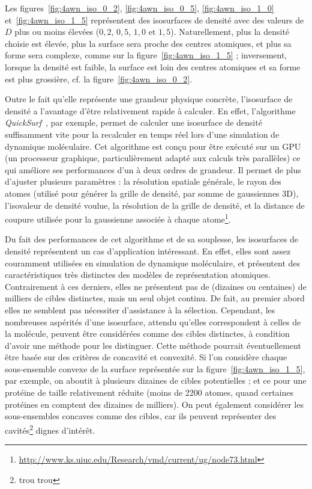 	Les figures~\ref{fig:4awn_iso_0_2}, \ref{fig:4awn_iso_0_5}, \ref{fig:4awn_iso_1_0} et~\ref{fig:4awn_iso_1_5} représentent des isosurfaces de densité avec des valeurs de $D$ plus ou moins élevées ($0,2$, $0,5$, $1,0$ et $1,5$). Naturellement, plus la densité choisie est élevée, plus la surface sera proche des centres atomiques, et plus sa forme sera complexe, comme sur la figure~\ref{fig:4awn_iso_1_5} ; inversement, lorsque la densité est faible, la surface est loin des centres atomiques et sa forme est plus grossière, cf. la figure~\ref{fig:4awn_iso_0_2}.
	
	Outre le fait qu'elle représente une grandeur physique concrète, l'isosurface de densité a l'avantage d'être relativement rapide à calculer. En effet, l'algorithme \emph{QuickSurf}~\cite{krone2012fast, roberts2013lattice, stone2013early, stone2013gpu, stone2014gpu, sener2014visualization}, par exemple, permet de calculer une isosurface de densité suffisamment vite pour la recalculer en temps réel lors d'une simulation de dynamique moléculaire. Cet algorithme est conçu pour être exécuté sur un GPU (un processeur graphique, particulièrement adapté aux calculs très parallèles) ce qui améliore ses performances d'un à deux ordres de grandeur. Il permet de plus d'ajuster plusieurs paramètres : la résolution spatiale générale, le rayon des atomes (utilisé pour générer la grille de densité, par somme de gaussiennes 3D), l'isovaleur de densité voulue, la résolution de la grille de densité, et la distance de coupure utilisée pour la gaussienne associée à chaque atome\footnote{\url{http://www.ks.uiuc.edu/Research/vmd/current/ug/node73.html}}.
	
	Du fait des performances de cet algorithme et de sa souplesse, les isosurfaces de densité représentent un cas d'application intéressant. En effet, elles sont assez couramment utilisées en simulation de dynamique moléculaire, et présentent des caractéristiques très distinctes des modèles de représentation atomiques. Contrairement à ces derniers, elles ne présentent pas de (dizaines ou centaines) de milliers de cibles distinctes, mais un seul objet continu. De fait, au premier abord elles ne semblent pas nécessiter d'assistance à la sélection. Cependant, les nombreuses aspérités d'une isosurface, attendu qu'elles correspondent à celles de la molécule, peuvent être considérées comme des cibles distinctes, à condition d'avoir une méthode pour les distinguer. Cette méthode pourrait éventuellement être basée sur des critères de concavité et convexité. Si l'on considère chaque sous-ensemble convexe de la surface représentée sur la figure~\ref{fig:4awn_iso_1_5}, par exemple, on aboutit à plusieurs dizaines de cibles potentielles ; et ce pour une protéine de taille relativement réduite (moins de 2200 atomes, quand certaines protéines en comptent des dizaines de milliers). On peut également considérer les sous-ensembles concaves comme des cibles, car ils peuvent représenter des cavités\footnote{trou trou} dignes d'intérêt.
	
